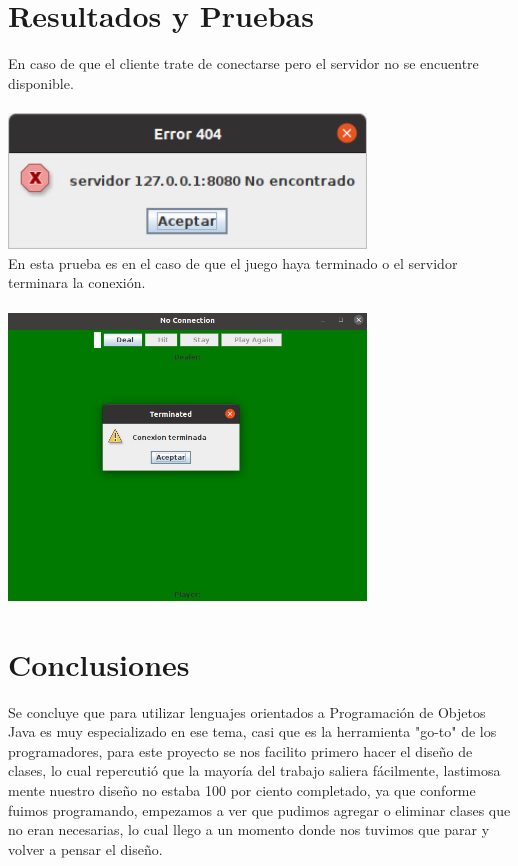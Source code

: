\documentclass{article}
\begin{document}
\section{Resultados y Pruebas} 
En caso de que el cliente trate de conectarse pero el servidor no se encuentre disponible.
\\\\
\includegraphics[width=9.5cm]{img/pba1.jpeg}\\[1cm]
En esta prueba es en el caso de que el juego haya terminado o el servidor terminara la conexión.
\\\\
\includegraphics[width=9.5cm]{img/pba2.jpeg}\\[1cm]

\newpage
\section{Conclusiones}

Se concluye que para utilizar lenguajes orientados a Programación de Objetos Java es muy especializado en ese tema, casi que es la herramienta "go-to" de los programadores, para este proyecto se nos facilito primero hacer el diseño de clases, lo cual repercutió que la mayoría del trabajo saliera fácilmente, lastimosa mente nuestro diseño no estaba 100 por ciento completado, ya que conforme fuimos programando, empezamos a ver que pudimos agregar o eliminar clases que no eran necesarias, lo cual llego a un momento donde nos tuvimos que parar y volver a pensar el diseño.
\\
\\
\newpage
\end{document}
